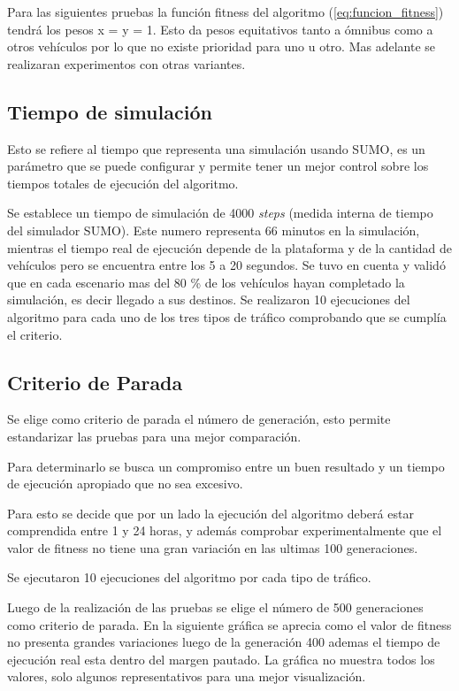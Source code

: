 Para las siguientes pruebas la función fitness del algoritmo (\ref{eq:funcion_fitness}) tendrá los pesos x = y = 1. Esto da pesos equitativos tanto a ómnibus como a otros vehículos por lo que no existe prioridad para uno u otro. Mas adelante se realizaran experimentos con otras variantes.


\subsection{Tiempo de simulación}
Esto se refiere al tiempo que representa una simulación usando SUMO,  es un parámetro que se puede configurar y permite tener un mejor control sobre los tiempos totales de ejecución del algoritmo.

Se establece un tiempo de simulación de 4000 \emph{steps} (medida interna de tiempo del simulador SUMO). Este numero representa 66 minutos en la simulación, mientras el tiempo real de ejecución depende de la plataforma y de la cantidad de vehículos pero se encuentra entre los 5 a 20 segundos. Se tuvo en cuenta y validó que en cada escenario mas del 80 \% de los vehículos hayan completado la simulación, es decir llegado a sus destinos. Se realizaron 10 ejecuciones del algoritmo para cada uno de los tres tipos de tráfico comprobando que se cumplía el criterio.


\subsection{Criterio de Parada}
Se elige como criterio de parada el número de generación, esto permite estandarizar las pruebas para una mejor comparación.

Para determinarlo se busca un compromiso entre un buen resultado y un tiempo de ejecución apropiado que no sea excesivo.

Para esto se decide que por un lado la ejecución del algoritmo deberá estar comprendida entre 1 y 24 horas, y además comprobar experimentalmente que el valor de fitness no tiene una gran variación en las ultimas 100 generaciones.

Se ejecutaron 10 ejecuciones del algoritmo por cada tipo de tráfico.

Luego de la realización de las pruebas se elige el número de 500 generaciones como criterio de parada.
En la siguiente gráfica se aprecia como el valor de fitness no presenta grandes variaciones luego de la generación 400 ademas el tiempo de ejecución real esta dentro del margen pautado. La gráfica no muestra todos los valores, solo algunos representativos para una mejor visualización.



